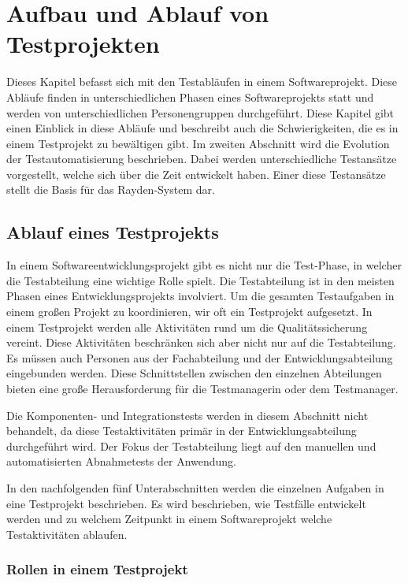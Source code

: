 \chapter{Aufbau und Ablauf von Testprojekten}
\label{cha:Konzept}

Dieses Kapitel befasst sich mit den Testabläufen in einem Softwareprojekt. Diese Abläufe finden in unterschiedlichen Phasen eines Softwareprojekts statt und werden von unterschiedlichen Personengruppen durchgeführt. Diese Kapitel gibt einen Einblick in diese Abläufe und beschreibt auch die Schwierigkeiten, die es in einem Testprojekt zu bewältigen gibt. Im zweiten Abschnitt wird die Evolution der Testautomatisierung beschrieben. Dabei werden unterschiedliche Testansätze vorgestellt, welche sich über die Zeit entwickelt haben. Einer diese Testansätze stellt die Basis für das Rayden-System dar.

\section{Ablauf eines Testprojekts}

In einem Softwareentwicklungsprojekt gibt es nicht nur die Test-Phase, in welcher die Testabteilung eine wichtige Rolle spielt. Die Testabteilung ist in den meisten Phasen eines Entwicklungsprojekts involviert. Um die gesamten Testaufgaben in einem großen Projekt zu koordinieren, wir oft ein Testprojekt aufgesetzt. In einem Testprojekt werden alle Aktivitäten rund um die Qualitätssicherung vereint. Diese Aktivitäten beschränken sich aber nicht nur auf die Testabteilung. Es müssen auch Personen aus der Fachabteilung und der Entwicklungsabteilung eingebunden werden. Diese Schnittstellen zwischen den einzelnen Abteilungen bieten eine große Herausforderung für die Testmanagerin oder dem Testmanager.

\SuperPar
Die Komponenten- und Integrationstests werden in diesem Abschnitt nicht behandelt, da diese Testaktivitäten primär in der Entwicklungsabteilung durchgeführt wird. Der Fokus der Testabteilung liegt auf den manuellen und automatisierten Abnahmetests der Anwendung.

\SuperPar
In den nachfolgenden fünf Unterabschnitten werden die einzelnen Aufgaben in eine Testprojekt beschrieben. Es wird beschrieben, wie Testfälle entwickelt werden und zu welchem Zeitpunkt in einem Softwareprojekt welche Testaktivitäten ablaufen.

\subsection{Rollen in einem Testprojekt}

